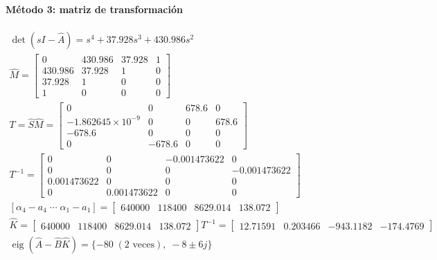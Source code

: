 \documentclass[11pt]{article}
\begin{document}
\paragraph{Método 3: matriz de transformación}
\begin{gather*}
\det(sI-\hat A)=s^{4} + 37.928s^{3} + 430.986s^{2}\\
\hat M=\begin{bmatrix}0 & 430.986 & 37.928 & 1 \\ 430.986 & 37.928 & 1 & 0 \\ 37.928 & 1 & 0 & 0 \\ 1 & 0 & 0 & 0\end{bmatrix}\\
T=\hat S\hat M=\begin{bmatrix}0 & 0 & 678.6 & 0 \\ -1.862645\times10^{-9} & 0 & 0 & 678.6 \\ -678.6 & 0 & 0 & 0 \\ 0 & -678.6 & 0 & 0\end{bmatrix}\\
T^{-1}=\begin{bmatrix}0 & 0 & -0.001473622 & 0 \\ 0 & 0 & 0 & -0.001473622 \\ 0.001473622 & 0 & 0 & 0 \\ 0 & 0.001473622 & 0 & 0\end{bmatrix}\\
[\alpha_4-a_4\;\cdots\;\alpha_1-a_1]=\begin{bmatrix}640000 & 118400 & 8629.014 & 138.072\end{bmatrix}\\
\hat K=\begin{bmatrix}640000 & 118400 & 8629.014 & 138.072\end{bmatrix}T^{-1}=\begin{bmatrix}12.71591 & 0.203466 & -943.1182 & -174.4769\end{bmatrix}\\
\operatorname{eig}(\hat A-\hat B\hat K)=\{-80\;(2\text{ veces}),\;-8\pm 6j\}
\end{gather*}
\end{document}
